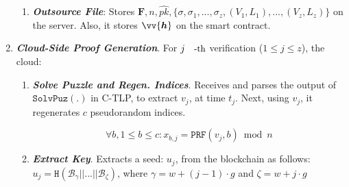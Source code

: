 \begin{enumerate}[leftmargin=.46cm]
\begin{enumerate}



\item\label{Outsource-File}\textbf{\textit{\small {Outsource File}}}: Stores ${\bm{F}},n,\hat{pk}, \{\sigma,\sigma_{\scriptscriptstyle 1},..., \sigma_{\scriptscriptstyle z}, (V_{\scriptscriptstyle 1},L_{\scriptscriptstyle 1}),...,(V_{\scriptscriptstyle z},L_{\scriptscriptstyle z})\}$   on the server. Also, it stores $\vv{\bm{h}}$ on the smart contract. 
\end{enumerate}


\item\textit{\textbf{Cloud-Side Proof Generation}}. For   $j\text{\small{-th}}$ verification  ($1\leq j\leq z$), the cloud:


\begin{enumerate} 
\item\label{Solve-Puzzle-Regen-Indices}\textbf{\textit{\small {Solve Puzzle and Regen.  Indices}}}.   Receives and parses the output of $\mathtt{SolvPuz}(.)$ in C-TLP, to extract $v_{\scriptscriptstyle j}$, at time $t_{\scriptscriptstyle j}$. Next, using $v_{\scriptscriptstyle j}$, it regenerates $c$ pseudorandom indices. 

$$\forall b, 1\leq b\leq c: x_{\scriptscriptstyle b,j}=\mathtt{PRF}(v_{\scriptscriptstyle j}, b)\bmod n$$ %


\item \textbf{\textit{\small {Extract Key}}}. Extracts a seed: $u_{\scriptscriptstyle j}$, from the blockchain as follows: $u_{\scriptscriptstyle j}=\mathtt{H}( \mathcal {B}_{\scriptscriptstyle \gamma}||...||  \mathcal {B}_{\scriptscriptstyle \zeta})$, where $\gamma=w+(j-1)\cdot g$ and $\zeta=w+j\cdot g$


\end{enumerate}
\end{enumerate}
